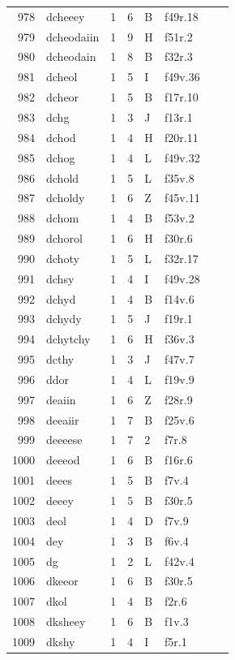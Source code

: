 \documentclass[11pt,a4paper]{article}
\begin{document}
\begin{landscape}
\begin{longtable}{@{}r>{\ttfamily}lrrl>{\ttfamily}l>{\raggedright\arraybackslash}p{80mm}>{\raggedright\arraybackslash}p{36mm}@{}}
978 & dcheeey & 1 & 6 & B & f49r.18 &  & \\
979 & dcheodaiin & 1 & 9 & H & f51r.2 &  & \\
980 & dcheodain & 1 & 8 & B & f32r.3 &  & \\
981 & dcheol & 1 & 5 & I & f49v.36 &  & \\
982 & dcheor & 1 & 5 & B & f17r.10 &  & \\
983 & dchg & 1 & 3 & J & f13r.1 &  & \\
984 & dchod & 1 & 4 & H & f20r.11 &  & \\
985 & dchog & 1 & 4 & L & f49v.32 &  & \\
986 & dchold & 1 & 5 & L & f35v.8 &  & \\
987 & dcholdy & 1 & 6 & Z & f45v.11 &  & \\
988 & dchom & 1 & 4 & B & f53v.2 &  & \\
989 & dchorol & 1 & 6 & H & f30r.6 &  & \\
990 & dchoty & 1 & 5 & L & f32r.17 &  & \\
991 & dchsy & 1 & 4 & I & f49v.28 &  & \\
992 & dchyd & 1 & 4 & B & f14v.6 &  & \\
993 & dchydy & 1 & 5 & J & f19r.1 &  & \\
994 & dchytchy & 1 & 6 & H & f36v.3 &  & \\
995 & dcthy & 1 & 3 & J & f47v.7 &  & \\
996 & ddor & 1 & 4 & L & f19v.9 &  & \\
997 & deaiin & 1 & 6 & Z & f28r.9 &  & \\
998 & deeaiir & 1 & 7 & B & f25v.6 &  & \\
999 & deeeese & 1 & 7 & 2 & f7r.8 &  & \\
1000 & deeeod & 1 & 6 & B & f16r.6 &  & \\
1001 & deees & 1 & 5 & B & f7v.4 &  & \\
1002 & deeey & 1 & 5 & B & f30r.5 &  & \\
1003 & deol & 1 & 4 & D & f7v.9 &  & \\
1004 & dey & 1 & 3 & B & f6v.4 &  & \\
1005 & dg & 1 & 2 & L & f42v.4 &  & \\
1006 & dkeeor & 1 & 6 & B & f30r.5 &  & \\
1007 & dkol & 1 & 4 & B & f2r.6 &  & \\
1008 & dksheey & 1 & 6 & B & f1v.3 &  & \\
1009 & dkshy & 1 & 4 & I & f5r.1 &  & \\

\end{longtable}
\end{landscape}
\end{document}
